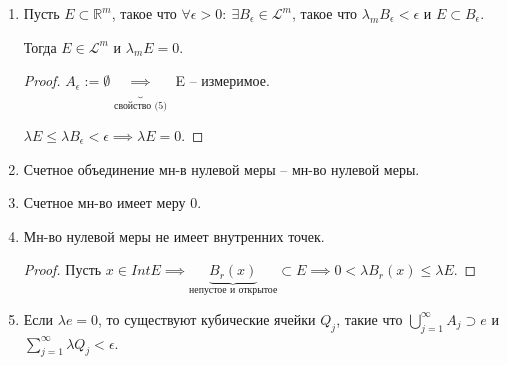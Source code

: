 \begin{properties}
\begin{enumerate}
{            $A_{\epsilon} \subset E \subset B_{\epsilon}$ и $\lambda_m (B_{\epsilon} \setminus A_{\epsilon}) < \epsilon$, тогда $E \in \mathscr{L}^m$
            
            \begin{proof}

                $A := \bigcup_{n=1}^{\infty} A_{\frac{1}{n}} \in \mathscr{L}^m$ и $B := \bigcap_{n=1}^{\infty} B_{\frac{1}{n}} \in \mathscr{L}^m$.

                $A \subset E \subset B$, $B \setminus A \subset B_{\frac{1}{n}} \setminus A_{\frac{1}{n}}$.

                $\lambda_m (B \setminus A) \leq \lambda_m (B_{\frac{1}{n}} \setminus A_{\frac{1}{n}}) < \frac{1}{n} \implies \lambda_m (B \setminus A) = 0$.

                $E \setminus A \subset B \setminus A \implies E \setminus A \in \mathscr{L}^m \implies E = E \setminus A \sqcup A \in \mathscr{L}^m$.
            \end{proof}
        }
        \item {
            Пусть $E \subset \mathbb{R}^m$, такое что $\forall \epsilon > 0: \ \exists B_{\epsilon} \in \mathscr{L}^m$, такое что $\lambda_m B_{\epsilon} < \epsilon$ и $E \subset B_{\epsilon}$.

            Тогда  $E \in \mathscr{L}^m$ и $\lambda_m E = 0$.

            \begin{proof}
                $A_{\epsilon} := \emptyset \underbrace{\implies}_{\text{свойство (5)}}$ E -- измеримое.

                $\lambda E \leq \lambda B_{\epsilon} < \epsilon \implies \lambda E = 0$.
            \end{proof}
        }
        \item {
            Счетное объединение мн-в нулевой меры -- мн-во нулевой меры.
        }
        \item {
            Счетное мн-во имеет меру 0.
        }
        \item {
            Мн-во нулевой меры не имеет внутренних точек.

            \begin{proof}
                Пусть $x \in Int E \implies \underbrace{B_r(x)}_{\text{непустое и открытое}} \subset E \implies 0 < \lambda B_r(x) \leq \lambda E$.
            \end{proof}
        }
        \item {
            Если $\lambda e = 0$, то существуют кубические ячейки $Q_j$, такие что $\bigcup_{j=1}^{\infty}A_j \supset e$ и $\sum_{j=1}^{\infty} \lambda Q_j < \epsilon$.

}
\end{enumerate}
\end{properties}
